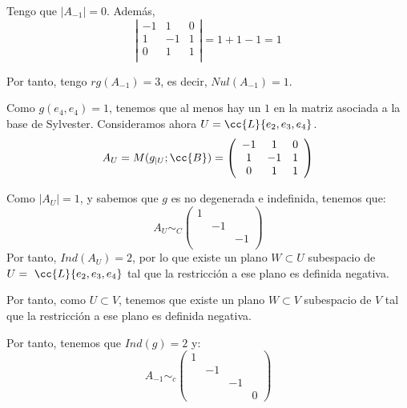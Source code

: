 \begin{ejercicio}
\begin{enumerate}
\begin{enumerate}
            Tengo que $|A_{-1}|=0$. Además, 
            \begin{equation*}
                \left| \begin{array}{ccc}
                    -1 & 1 & 0 \\
                    1 & -1 & 1 \\
                    0 & 1 & 1 \\
                \end{array} \right|
                = 1+1-1 = 1
            \end{equation*}

            Por tanto, tengo $rg(A_{-1})=3$, es decir, $Nul(A_{-1}) = 1$.

            Como $g(e_4, e_4)=1$, tenemos que al menos hay un $1$ en la matriz asociada a la base de Sylvester. Consideramos ahora $U=\cc{L}\{e_2, e_3, e_4\}$.
            \begin{equation*}
                A_U=M(g_{|U}; \cc{B}) = \left( \begin{array}{cccc}
                    -1 & 1 & 0 \\
                    1 & -1 & 1 \\
                    0 & 1 & 1 \\
                \end{array} \right)
            \end{equation*}

            Como $|A_U|=1$, y sabemos que $g$ es no degenerada e indefinida, tenemos que:
            \begin{equation*}
                A_U\sim_C \left( \begin{array}{cccc}
                    1 &  &  \\
                     & -1 &  \\
                     &  & -1 \\
                \end{array} \right)
            \end{equation*}
            Por tanto, $Ind(A_U)=2$, por lo que existe un plano $W\subset U$ subespacio de $U=~\cc{L}\{e_2, e_3, e_4\}$ tal que la restricción a ese plano es definida negativa.

            Por tanto, como $U\subset V$, tenemos que existe un plano $W\subset V$ subespacio de $V$ tal que la restricción a ese plano es definida negativa.

            Por tanto, tenemos que $Ind(g)=2$ y:
            \begin{equation*}
                A_{-1} \sim_c \left( \begin{array}{cccc}
                    1 &  &  \\
                     & -1 &  \\
                     &  & -1 \\
                     &&&0
                \end{array} \right)
            \end{equation*}


\end{enumerate}
\end{enumerate}
\end{ejercicio}
